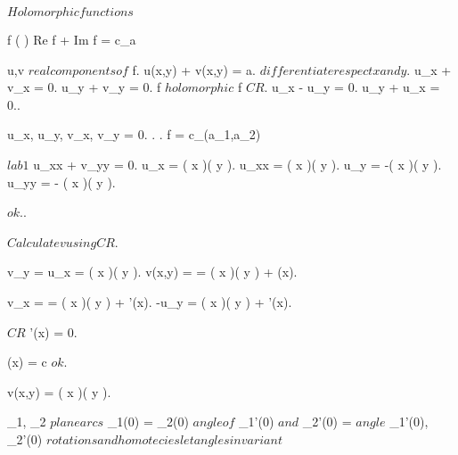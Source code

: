 \documentclass[../Main/main]{subfiles}
\begin{document}
\unit{ $ Holomorphic functions $ }
{
	{
		{
			f \in \Hc( \C ) \suchthat Re f + Im f = c_a
		}
		\showthat
		{
		}
		\demonstration
		{
			u,v $ real components of $ f.
			u(x,y) + v(x,y) = a.
			$ differentiate respect x and y $.
			u_x + v_x = 0.
			u_y + v_y = 0.
			f $ holomorphic $ \imp f $ CR $.
			u_x - u_y = 0.
			u_y + u_x = 0..

			u_x, u_y, v_x, v_y = 0.
			.
			.
			f = c_{(a_1,a_2)}
		}
	}


	{
		{
		}
		\showthat
		{
		}
		\demonstration
		{
			$lab 1$ \imp u_{xx} + v_{yy} = 0.
			u_x = \exp( x )\cos( y ).
			u_{xx} = \exp( x )\cos( y ).
			u_y = -\exp( x )\sin( y ).
			u_{yy} = - \exp( x )\cos( y ).

			$ok$..

			$ Calculate v using CR $.

			v_y = u_x = \exp( x )\cos( y ).
			v(x,y) =  = \exp( x )\sin( y ) + \phi(x).

			v_x =  = \exp( x )\sin( y ) + \phi'(x).
			-u_y = \exp( x )\sin( y ) + \phi'(x).

			$CR$ \imp \phi'(x) = 0.

			{
				\phi(x) = c $ ok $.
			}

			v(x,y) = \exp( x )\sin( y ).



		}
	}


	
	
	{
		{
			\gamma_1, \gamma_2 $ plane arcs $ \suchthat \gamma_1(0) = \gamma_2(0)
		}
		\holds
		{
			$ angle of $ \gamma_1'(0) $ and $ \gamma_2'(0) = $ angle $ \sigma_1'(0), \sigma_2'(0) 
		}
		\demonstration
		{
			$ rotations and homotecies let angles invariant $
		}
	}

}
\end{document}
